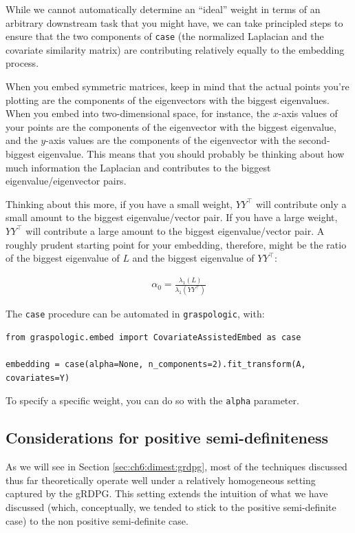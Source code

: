 While we cannot automatically determine an ``ideal'' weight in terms of an arbitrary downstream task that you might have, we can take principled steps to ensure that the two components of \texttt{case} (the normalized Laplacian and the covariate similarity matrix) are contributing relatively equally to the embedding process.

When you embed symmetric matrices, keep in mind that the actual points you’re plotting are the components of the eigenvectors with the biggest eigenvalues. When you embed into two-dimensional space, for instance, the $x$-axis values of your points are the components of the eigenvector with the biggest eigenvalue, and the $y$-axis values are the components of the eigenvector with the second-biggest eigenvalue. This means that you should probably be thinking about how much information the Laplacian and contributes to the biggest eigenvalue/eigenvector pairs.

Thinking about this more, if you have a small weight, $YY^\top$ will contribute only a small amount to the biggest eigenvalue/vector pair. If you have a large weight, $YY^\top$ will contribute a large amount to the biggest eigenvalue/vector pair. A roughly prudent starting point for your embedding, therefore, might be the ratio of the biggest eigenvalue of $L$ and the biggest eigenvalue of $YY^\top$:

\begin{align*}
\alpha_0 = \frac{\lambda_1 (L)}{\lambda_1 (YY^\top)}    
\end{align*}

The \texttt{case} procedure can be automated in \texttt{graspologic}, with:

\begin{lstlisting}[style=python]
from graspologic.embed import CovariateAssistedEmbed as case

embedding = case(alpha=None, n_components=2).fit_transform(A, covariates=Y)
\end{lstlisting}
To specify a specific weight, you can do so with the \texttt{alpha} parameter.

\subsection{Considerations for positive semi-definiteness}

As we will see in Section \ref{sec:ch6:dimest:grdpg}, most of the techniques discussed thus far theoretically operate well under a relatively homogeneous setting captured by the gRDPG. This setting extends the intuition of what we have discussed (which, conceptually, we tended to stick to the positive semi-definite case) to the non positive semi-definite case. 

